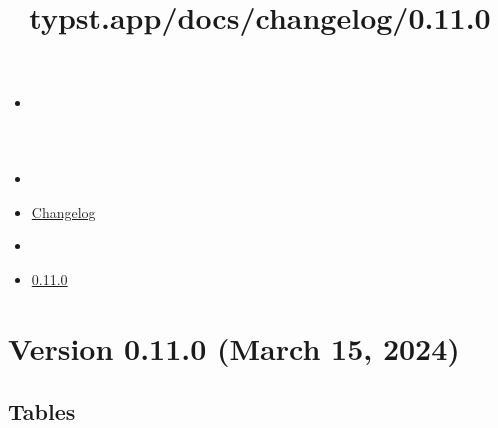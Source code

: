 \title{typst.app/docs/changelog/0.11.0}

\begin{itemize}
\tightlist
\item
  \href{/docs}{}
\item
  
\item
  \href{/docs/changelog/}{Changelog}
\item
  
\item
  \href{/docs/changelog/0.11.0/}{0.11.0}
\end{itemize}

\section{Version 0.11.0 (March 15,
2024)}\label{version-0.11.0-march-15-2024}

\subsection{Tables}\label{tables}

